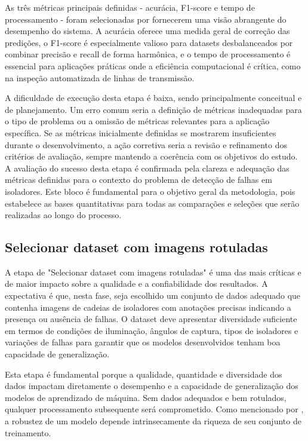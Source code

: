 As três métricas principais definidas - acurácia, F1-score e tempo de processamento - foram selecionadas por fornecerem uma visão abrangente do desempenho do sistema. A acurácia oferece uma medida geral de correção das predições, o F1-score é especialmente valioso para datasets desbalanceados por combinar precisão e recall de forma harmônica, e o tempo de processamento é essencial para aplicações práticas onde a eficiência computacional é crítica, como na inspeção automatizada de linhas de transmissão.

A dificuldade de execução desta etapa é baixa, sendo principalmente conceitual e de planejamento. Um erro comum seria a definição de métricas inadequadas para o tipo de problema ou a omissão de métricas relevantes para a aplicação específica. Se as métricas inicialmente definidas se mostrarem insuficientes durante o desenvolvimento, a ação corretiva seria a revisão e refinamento dos critérios de avaliação, sempre mantendo a coerência com os objetivos do estudo. A avaliação do sucesso desta etapa é confirmada pela clareza e adequação das métricas definidas para o contexto do problema de detecção de falhas em isoladores. Este bloco é fundamental para o objetivo geral da metodologia, pois estabelece as bases quantitativas para todas as comparações e seleções que serão realizadas ao longo do processo.

\subsection{Selecionar dataset com imagens rotuladas}
A etapa de "Selecionar dataset com imagens rotuladas" é uma das mais críticas e de maior impacto sobre a qualidade e a confiabilidade dos resultados. A expectativa é que, nesta fase, seja escolhido um conjunto de dados adequado que contenha imagens de cadeias de isoladores com anotações precisas indicando a presença ou ausência de falhas. O dataset deve apresentar diversidade suficiente em termos de condições de iluminação, ângulos de captura, tipos de isoladores e variações de falhas para garantir que os modelos desenvolvidos tenham boa capacidade de generalização.

Esta etapa é fundamental porque a qualidade, quantidade e diversidade dos dados impactam diretamente o desempenho e a capacidade de generalização dos modelos de aprendizado de máquina. Sem dados adequados e bem rotulados, qualquer processamento subsequente será comprometido. Como mencionado por , a robustez de um modelo depende intrinsecamente da riqueza de seu conjunto de treinamento.

